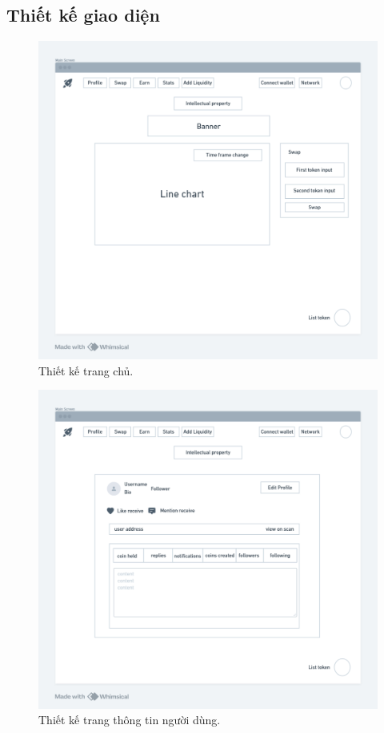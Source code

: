 \subsection{Thiết kế giao diện}
\begin{figure}[H]
    \centering
    \includegraphics[width=1\textwidth]{figures/c2/MainScreen.png}
    \caption{Thiết kế trang chủ.}
    \label{fig:architecture-diagram}
\end{figure}

\begin{figure}[H]
    \centering
    \includegraphics[width=1\textwidth]{figures/c2/Profile.png}
    \caption{Thiết kế trang thông tin người dùng.}
    \label{fig:architecture-diagram}
\end{figure}

